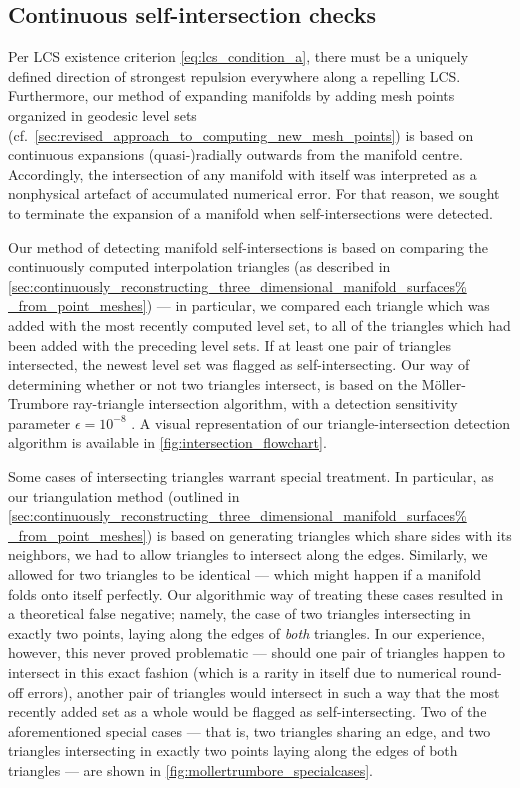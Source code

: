 \subsection{Continuous self-intersection checks}
\label{sub:continuous_self_intersection_checks}

Per LCS existence criterion \eqref{eq:lcs_condition_a}, there must be a
uniquely defined direction of strongest repulsion everywhere along a repelling
LCS. Furthermore, our method of expanding manifolds by adding mesh points
organized in geodesic level sets (cf.\
\cref{sec:revised_approach_to_computing_new_mesh_points}) is based on
continuous expansions (quasi-)radially outwards from the manifold centre.
Accordingly, the intersection of any manifold with itself was interpreted as
a nonphysical artefact of accumulated numerical error. For that reason, we
sought to terminate the expansion of a manifold when self-intersections
were detected.

Our method of detecting manifold self-intersections is based on comparing the
continuously computed interpolation triangles (as described in
\cref{sec:continuously_reconstructing_three_dimensional_manifold_surfaces%
_from_point_meshes}) --- in particular, we compared each triangle which was
added with the most recently computed level set, to all of the
triangles which had been added with the preceding level sets. If at least one
pair of triangles intersected, the newest level set was flagged as
self-intersecting. Our way of determining whether or not two triangles
intersect, is based on the Möller-Trumbore ray-triangle intersection algorithm,
with a detection sensitivity parameter $\epsilon=10^{-8}$
\parencite{moller1997fast}. A visual representation of our
triangle-intersection detection algorithm is available in
\cref{fig:intersection_flowchart}.




Some cases of intersecting triangles warrant special treatment. In particular,
as our triangulation method (outlined in
\cref{sec:continuously_reconstructing_three_dimensional_manifold_surfaces%
_from_point_meshes}) is based on generating triangles which share sides with
its neighbors, we had to allow triangles to intersect along the edges.
Similarly, we allowed for two triangles to be identical --- which might happen
if a manifold folds onto itself perfectly. Our algorithmic way of treating
these cases resulted in a theoretical false negative; namely, the case of two
triangles intersecting in exactly two points, laying along the edges of
\emph{both} triangles. In our experience, however, this never proved
problematic --- should one pair of triangles happen to intersect in this exact
fashion (which is a rarity in itself due to numerical round-off errors),
another pair of triangles would intersect in such a way that the most recently
added set as a whole would be flagged as self-intersecting. Two of the
aforementioned special cases --- that is, two triangles sharing an edge, and
two triangles intersecting in exactly two points laying along the edges of both
triangles --- are shown in \cref{fig:mollertrumbore_specialcases}.

